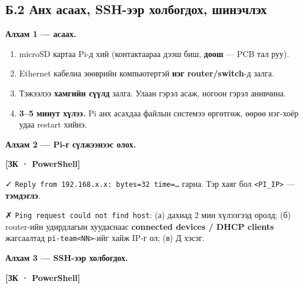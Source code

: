 \hypertarget{ux431.2-ux430ux43dux445-ux430ux441ux430ux430ux445-ssh-ux44dux44dux440-ux445ux43eux43bux431ux43eux433ux434ux43eux445-ux448ux438ux43dux44dux447ux43bux44dux445}{%
\subsection{Б.2 Анх асаах, SSH-ээр холбогдох, шинэчлэх}\label{ux431.2-ux430ux43dux445-ux430ux441ux430ux430ux445-ssh-ux44dux44dux440-ux445ux43eux43bux431ux43eux433ux434ux43eux445-ux448ux438ux43dux44dux447ux43bux44dux445}}

\textbf{Алхам 1 --- асаах.}

\begin{enumerate}
\def\labelenumi{\arabic{enumi}.}
\tightlist
\item
  microSD картаа Pi-д хий (контактаараа дээш биш, \textbf{доош} --- PCB тал руу).
\item
  Ethernet кабелиа зөөврийн компьютертэй \textbf{нэг router/switch}-д залга.
\item
  Тэжээлээ \textbf{хамгийн сүүлд} залга. Улаан гэрэл асаж, ногоон гэрэл анивчина.
\item
  \textbf{3--5 минут хүлээ.} Pi анх асахдаа файлын системээ өргөтгөж, өөрөө нэг-хоёр удаа restart хийнэ.
\end{enumerate}

\textbf{Алхам 2 --- Pi-г сүлжээнээс олох.}

\textbf{{[}ЗК · PowerShell{]}}

\begin{Shaded}
\begin{Highlighting}[]
\end{Highlighting}
\end{Shaded}

✓ \texttt{Reply\ from\ 192.\allowbreak{}168.\allowbreak{}x.\allowbreak{}x:\allowbreak{}\ bytes=\allowbreak{}32\ time=\allowbreak{}\ldots{}} гарна. Тэр хаяг бол \texttt{\textless{}PI\_\allowbreak{}IP\textgreater{}} --- \textbf{тэмдэглэ}.

✗ \texttt{Ping\ request\ could\ not\ find\ host}: (а) дахиад 2 мин хүлээгээд оролд; (б) router-ийн удирдлагын хуудаснаас \textbf{connected devices / DHCP clients} жагсаалтад \texttt{pi-team\textless{}NN\textgreater{}}-ийг хайж IP-г ол; (в) Д хэсэг.

\textbf{Алхам 3 --- SSH-ээр холбогдох.}

\textbf{{[}ЗК · PowerShell{]}}

